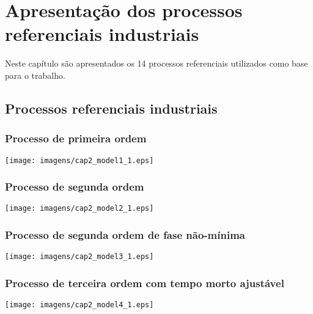 \chapter{Apresentação dos processos referenciais industriais
    \label{cap:processos-referenciais}}

Neste capítulo são apresentados os 14 processos referenciais utilizados
como base para o trabalho.

\section{Processos referenciais industriais}

\subsection{Processo de primeira ordem}

    \begin{center}
        \texttt{[image: imagens/cap2\_model1\_1.eps]}
    \end{center}

\subsection{Processo de segunda ordem}

    \begin{center}
        \texttt{[image: imagens/cap2\_model2\_1.eps]}
    \end{center}

\subsection{Processo de segunda ordem de fase não-mínima}

    \begin{center}
        \texttt{[image: imagens/cap2\_model3\_1.eps]}
    \end{center}

\subsection{Processo de terceira ordem com tempo morto ajustável}

    \begin{center}
        \texttt{[image: imagens/cap2\_model4\_1.eps]}
    \end{center}

